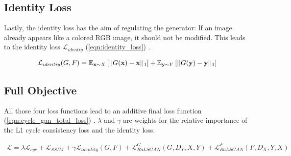 \subsection*{Identity Loss}
Lastly, the identity loss has the aim of regulating the generator:
If an image already appears like a colored RGB image, it should not be modified.
This leads to the identity loss $\mathcal{L}_{identiy}$ (\autoref{eqn:identity_loss}) \parencite{mehri}.

\begin{equation}
   \label{eqn:identity_loss}
   \begin{aligned}
      \mathcal{L}_{identiy}(G, F) = \mathbb{E}_{\mathbf{x} \sim X} \left[||G(\mathbf{x}) - \mathbf{x}||_1\right] + \mathbb{E}_{\mathbf{y} \sim Y} \left[||G(\mathbf{y}) - \mathbf{y}||_1\right]
   \end{aligned}
\end{equation}

\subsection*{Full Objective}
All those four loss functions lead to an additive final loss function (\autoref{eqn:cycle_gan_total_loss}) \parencite{mehri}.
$\lambda$ and $\gamma$ are weights for the relative importance of the L1 cycle consistency loss and the identity loss.

\begin{equation}
   \label{eqn:cycle_gan_total_loss}
   \begin{aligned}
      \mathcal{L} = \lambda \mathcal{L}_{cyc} + \mathcal{L}_{SSIM} + \gamma \mathcal{L}_{identity}(G,F) + \mathcal{L}_{RaLSGAN}^G(G,D_Y,X,Y) + \mathcal{L}_{RaLSGAN}^F(F,D_X,Y,X)
   \end{aligned}
\end{equation}

